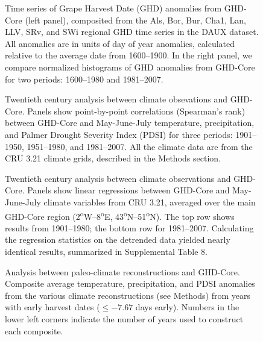 \documentclass[final]{nature}
\begin{document}
\begin{figure}
\caption{Time series of Grape Harvest Date (GHD) anomalies from GHD-Core (left panel), composited from the Als, Bor, Bur, Cha1, Lan, LLV, SRv, and SWi regional GHD time series in the DAUX dataset. All anomalies are in units of day of year anomalies, calculated relative to the average date from 1600--1900. In the right panel, we compare normalized histograms of GHD anomalies from GHD-Core for two periods: 1600--1980 and 1981--2007.}
\end{figure}

\begin{figure}
\caption{Twentieth century analysis between climate obsevations and GHD-Core. Panels show point-by-point correlations (Spearman's rank) between GHD-Core and May-June-July temperature, precipitation, and Palmer Drought Severity Index (PDSI) for three periods: 1901--1950, 1951--1980, and 1981--2007. All the climate data are from the CRU 3.21 climate grids, described in the Methods section.}
\end{figure}

\begin{figure}
\caption{Twentieth century analysis between climate observations and GHD-Core. Panels show linear regressions between GHD-Core and May-June-July climate variables from CRU 3.21, averaged over the main GHD-Core region (2\textsuperscript{o}W--8\textsuperscript{o}E, 43\textsuperscript{o}N--51\textsuperscript{o}N). The top row shows results from 1901--1980; the bottom row for 1981--2007. Calculating the regression statistics on the detrended data yielded nearly identical results, summarized in Supplemental Table 8.}
\end{figure}

\begin{figure}
\caption{Analysis between paleo-climate reconstructions and GHD-Core. Composite average temperature, precipitation, and PDSI anomalies from the various climate reconstructions (see Methods) from years with early harvest dates ($\le-7.67$ days early). Numbers in the lower left corners indicate the number of years used to construct each composite.}
\end{figure}
\end{document}
